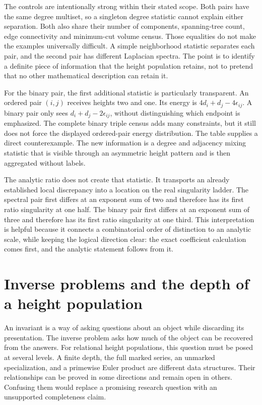 \documentclass[
  11pt,
  a4paper,
]{report}
\begin{document}
The controls are intentionally strong within their stated scope. Both
pairs have the same degree multiset, so a singleton degree statistic
cannot explain either separation. Both also share their number of
components, spanning-tree count, edge connectivity and minimum-cut
volume census. Those equalities do not make the examples universally
difficult. A simple neighborhood statistic separates each pair, and the
second pair has different Laplacian spectra. The point is to identify a
definite piece of information that the height population retains, not to
pretend that no other mathematical description can retain it.

For the binary pair, the first additional statistic is particularly
transparent. An ordered pair \((i,j)\) receives heights two and one. Its
energy is \(4d_i+d_j-4\epsilon_{ij}\). A binary pair only sees
\(d_i+d_j-2\epsilon_{ij}\), without distinguishing which endpoint is
emphasized. The complete binary triple census adds many constraints, but
it still does not force the displayed ordered-pair energy distribution.
The table supplies a direct counterexample. The new information is a
degree and adjacency mixing statistic that is visible through an
asymmetric height pattern and is then aggregated without labels.

The analytic ratio does not create that statistic. It transports an
already established local discrepancy into a location on the real
singularity ladder. The spectral pair first differs at an exponent sum
of two and therefore has its first ratio singularity at one half. The
binary pair first differs at an exponent sum of three and therefore has
its first ratio singularity at one third. This interpretation is helpful
because it connects a combinatorial order of distinction to an analytic
scale, while keeping the logical direction clear: the exact coefficient
calculation comes first, and the analytic statement follows from it.

\hypertarget{inverse-problems-and-the-depth-of-a-height-population}{%
\chapter{Inverse problems and the depth of a height
population}\label{inverse-problems-and-the-depth-of-a-height-population}}

An invariant is a way of asking questions about an object while
discarding its presentation. The inverse problem asks how much of the
object can be recovered from the answers. For relational height
populations, this question must be posed at several levels. A finite
depth, the full marked series, an unmarked specialization, and a
primewise Euler product are different data structures. Their
relationships can be proved in some directions and remain open in
others. Confusing them would replace a promising research question with
an unsupported completeness claim.
\end{document}

